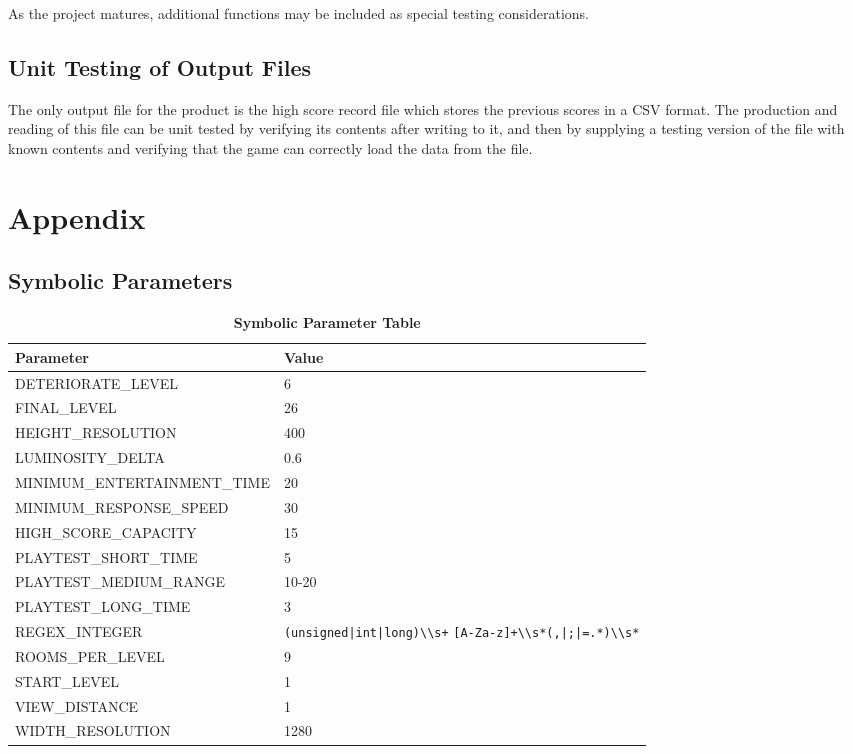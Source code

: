 \documentclass[12pt, titlepage]{article}
\newcommand{\rev}[1]{\textcolor{RevisionColour}{#1}}
\begin{document}
		As the project matures, additional functions may be included as special testing considerations.

	\subsection{Unit Testing of Output Files}
		The only output file for the product is the high score record file which stores the previous scores in a CSV format.  The production and reading of this file can be unit tested by verifying its contents after writing to it, and then by supplying a testing version of the file with known contents and verifying that the game can correctly load the data from the file.

\newpage





\newpage
\section{Appendix}
\label{section7}

	\subsection{Symbolic Parameters}

		\begin{table}[h!]
			\centering
			\caption{\textbf{Symbolic Parameter Table}}
			\label{symbolicParameters}
			\bigskip
			\def\arraystretch{1.6}


			\begin{tabular}{| C{18em} | C{15em} |}
				\bottomrule
				\textbf{Parameter} & \textbf{Value} \\
				\hline
				\rev{DETERIORATE\_LEVEL} & \rev{6} \\
				FINAL\_LEVEL & 26 \\
				HEIGHT\_RESOLUTION & 400 \\
				LUMINOSITY\_DELTA & \rev{0.6} \\
				MINIMUM\_ENTERTAINMENT\_TIME & 20 \\
				MINIMUM\_RESPONSE\_SPEED & 30 \\
				HIGH\_SCORE\_CAPACITY & 15 \\
				PLAYTEST\_SHORT\_TIME & 5 \\
				PLAYTEST\_MEDIUM\_RANGE & 10-20 \\
				PLAYTEST\_LONG\_TIME & 3 \\
				REGEX\_INTEGER & \rev{\lstinline$(unsigned|int|long)\\s+$ \newline \lstinline$[A-Za-z]+\\s*(,|;|=.*)\\s*$} \\
				ROOMS\_PER\_LEVEL & 9 \\
				START\_LEVEL & 1 \\
				VIEW\_DISTANCE & 1 \\
				WIDTH\_RESOLUTION & 1280 \\
				\toprule
			\end{tabular}
		\end{table}
\end{document}
